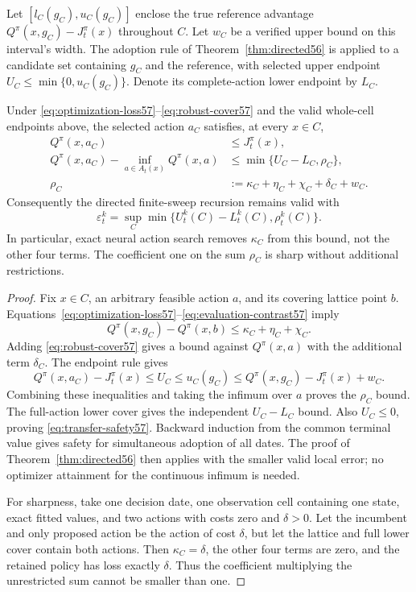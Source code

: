 Let $[l_C(g_C),u_C(g_C)]$ enclose the true reference advantage
$Q^\pi(x,g_C)-J_t^\pi(x)$ throughout $C$. Let $w_C$ be a verified upper bound on this interval's width. The adoption rule of Theorem~\ref{thm:directed56} is applied to a candidate set containing $g_C$ and the reference, with selected upper endpoint $U_C\le\min\{0,u_C(g_C)\}$. Denote its complete-action lower endpoint by $L_C$.

\begin{theorem}\label{thm:transfer57}
Under \eqref{eq:optimization-loss57}--\eqref{eq:robust-cover57} and the valid whole-cell endpoints above, the selected action $a_C$ satisfies, at every $x\in C$,
\begin{align}
 Q^\pi(x,a_C)&\le J_t^\pi(x),\label{eq:transfer-safety57}\\
 Q^\pi(x,a_C)-\inf_{a\in A_t(x)}Q^\pi(x,a)
 &\le \min\{U_C-L_C,\rho_C\},\label{eq:transfer-gap57}\\
 \rho_C&:=\kappa_C+\eta_C+\chi_C+\delta_C+w_C.\nonumber
\end{align}
Consequently the directed finite-sweep recursion remains valid with
\[
 \varepsilon_t^k=\sup_C\min\{U_t^k(C)-L_t^k(C),\rho_t^k(C)\}.
\]
In particular, exact neural action search removes $\kappa_C$ from this bound, not the other four terms. The coefficient one on the sum $\rho_C$ is sharp without additional restrictions.
\end{theorem}
\begin{proof}
Fix $x\in C$, an arbitrary feasible action $a$, and its covering lattice point $b$. Equations~\eqref{eq:optimization-loss57}--\eqref{eq:evaluation-contrast57} imply
\[
 Q^\pi(x,g_C)-Q^\pi(x,b)
 \le\kappa_C+\eta_C+\chi_C.
\]
Adding \eqref{eq:robust-cover57} gives a bound against $Q^\pi(x,a)$ with the additional term $\delta_C$. The endpoint rule gives
\[
 Q^\pi(x,a_C)-J_t^\pi(x)
 \le U_C\le u_C(g_C)
 \le Q^\pi(x,g_C)-J_t^\pi(x)+w_C.
\]
Combining these inequalities and taking the infimum over $a$ proves the $\rho_C$ bound. The full-action lower cover gives the independent $U_C-L_C$ bound. Also $U_C\le0$, proving \eqref{eq:transfer-safety57}. Backward induction from the common terminal value gives safety for simultaneous adoption of all dates. The proof of Theorem~\ref{thm:directed56} then applies with the smaller valid local error; no optimizer attainment for the continuous infimum is needed.

For sharpness, take one decision date, one observation cell containing one state, exact fitted values, and two actions with costs zero and $\delta>0$. Let the incumbent and only proposed action be the action of cost $\delta$, but let the lattice and full lower cover contain both actions. Then $\kappa_C=\delta$, the other four terms are zero, and the retained policy has loss exactly $\delta$. Thus the coefficient multiplying the unrestricted sum cannot be smaller than one.
\end{proof}

